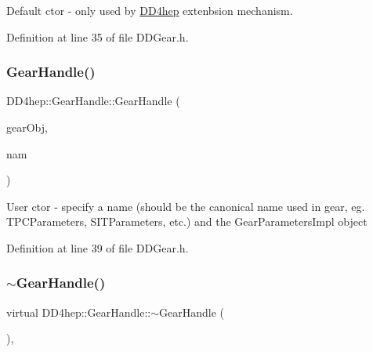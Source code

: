 Default c\textquotesingle{}tor -\/ only used by \hyperlink{namespace_d_d4hep}{D\+D4hep} extenbsion mechanism. 

Definition at line 35 of file D\+D\+Gear.\+h.

\hypertarget{class_d_d4hep_1_1_gear_handle_adeb098c8edf707d3d122de032ff476fd}{}\label{class_d_d4hep_1_1_gear_handle_adeb098c8edf707d3d122de032ff476fd} 
\subsubsection{\texorpdfstring{Gear\+Handle()}{GearHandle()}\hspace{0.1cm}{\footnotesize\ttfamily [2/4]}}
{\footnotesize\ttfamily D\+D4hep\+::\+Gear\+Handle\+::\+Gear\+Handle (\begin{DoxyParamCaption}\item[{gear\+::\+Gear\+Parameters\+Impl $\ast$}]{gear\+Obj,  }\item[{const std\+::string \&}]{nam }\end{DoxyParamCaption})\hspace{0.3cm}{\ttfamily [inline]}}

User c\textquotesingle{}tor -\/ specify a name (should be the canonical name used in gear, eg. T\+P\+C\+Parameters, S\+I\+T\+Parameters, etc.) and the Gear\+Parameters\+Impl object 

Definition at line 39 of file D\+D\+Gear.\+h.

\hypertarget{class_d_d4hep_1_1_gear_handle_a7b8b36839e741d9d3e4bb22f44262f01}{}\label{class_d_d4hep_1_1_gear_handle_a7b8b36839e741d9d3e4bb22f44262f01} 
\subsubsection{\texorpdfstring{$\sim$\+Gear\+Handle()}{~GearHandle()}}
{\footnotesize\ttfamily virtual D\+D4hep\+::\+Gear\+Handle\+::$\sim$\+Gear\+Handle (\begin{DoxyParamCaption}{ }\end{DoxyParamCaption})\hspace{0.3cm}{\ttfamily [inline]}, {\ttfamily [virtual]}}


